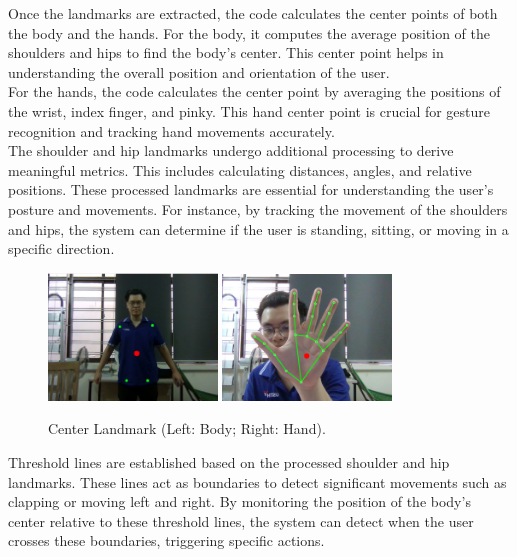 \documentclass[12pt]{article}
\begin{document}
Once the landmarks are extracted, the code calculates the center points of both the body and the hands. For the body, it computes the average position of the shoulders and hips to find the body’s center. This center point helps in understanding the overall position and orientation of the user.\\

For the hands, the code calculates the center point by averaging the positions of the wrist, index finger, and pinky. This hand center point is crucial for gesture recognition and tracking hand movements accurately.\\

The shoulder and hip landmarks undergo additional processing to derive meaningful metrics. This includes calculating distances, angles, and relative positions. These processed landmarks are essential for understanding the user's posture and movements. For instance, by tracking the movement of the shoulders and hips, the system can determine if the user is standing, sitting, or moving in a specific direction.\\

\begin{figure}[ht]
    \centering
    \includegraphics[width=0.4\textwidth]{pose2.png}
    \includegraphics[width=0.4\textwidth]{hand2.png}
    \caption{Center Landmark (Left: Body; Right: Hand).}
\end{figure}

Threshold lines are established based on the processed shoulder and hip landmarks. These lines act as boundaries to detect significant movements such as clapping or moving left and right. By monitoring the position of the body’s center relative to these threshold lines, the system can detect when the user crosses these boundaries, triggering specific actions.\\
\end{document}
